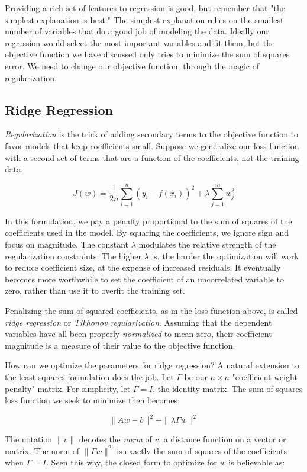 \documentclass[10pt]{article}
\begin{document}
Providing a rich set of features to regression is good, but remember that "the simplest explanation is best." The simplest explanation relies on the smallest number of variables that do a good job of modeling the data. Ideally our regression would select the most important variables and fit them, but the objective function we have discussed only tries to minimize the sum of squares error. We need to change our objective function, through the magic of regularization.

\subsection{Ridge Regression}
\textit{Regularization} is the trick of adding secondary terms to the objective function to favor models that keep coefficients small. Suppose we generalize our loss function with a second set of terms that are a function of the coefficients, not the training data:

\[
J(w) = \frac{1}{2n} \sum_{i=1}^{n} \left(y_{i}-f(x_{i})\right)^{2} + \lambda \sum_{j=1}^{m} w_{j}^{2}
\]

In this formulation, we pay a penalty proportional to the sum of squares of the coefficients used in the model. By squaring the coefficients, we ignore sign and focus on magnitude. The constant $\lambda$ modulates the relative strength of the regularization constraints. The higher $\lambda$ is, the harder the optimization will work to reduce coefficient size, at the expense of increased residuals. It eventually becomes more worthwhile to set the coefficient of an uncorrelated variable to zero, rather than use it to overfit the training set.

Penalizing the sum of squared coefficients, as in the loss function above, is called \textit{ridge regression} or \textit{Tikhonov regularization}. Assuming that the dependent variables have all been properly \textit{normalized} to mean zero, their coefficient magnitude is a measure of their value to the objective function.

How can we optimize the parameters for ridge regression? A natural extension to the least squares formulation does the job. Let $\Gamma$ be our $n \times n$ "coefficient weight penalty" matrix. For simplicity, let $\Gamma = I$, the identity matrix. The sum-of-squares loss function we seek to minimize then becomes:

\[
\|A w-b\|^{2} + \|\lambda \Gamma w\|^{2}
\]

The notation $\|v\|$ denotes the \textit{norm} of $v$, a distance function on a vector or matrix. The norm of $\|\Gamma w\|^{2}$ is exactly the sum of squares of the coefficients when $\Gamma = I$. Seen this way, the closed form to optimize for $w$ is believable as:
\end{document}

